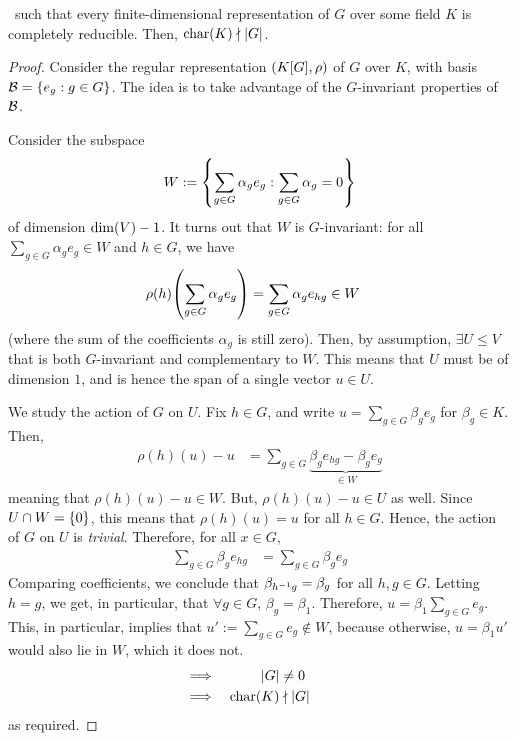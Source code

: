 \begin{theorem}
    \ such that every finite-dimensional representation of $G$ over some field $K$ is completely reducible. Then, $\operatorname{char}\!\left( K \right) \nmid \left\lvert G \right\rvert$.
\end{theorem}
\begin{proof}
    Consider the regular representation $\left( K[G], \rho \right)$ of $G$ over $K$, with basis $\mathcal{B} = \left\{ e_g : g \in G \right\}$. The idea is to take advantage of the $G$-invariant properties of $\mathcal{B}$.

    Consider the subspace
    \begin{align*}
        W := \left\{ \sum_{g \in G} \alpha_g e_g : \sum_{g \in G} \alpha_g = 0 \right\}
    \end{align*}
    of dimension $\dim\!\left( V \right) - 1$. It turns out that $W$ is $G$-invariant: for all $\sum_{g \in G} \alpha_g e_g \in W$ and $h \in G$, we have
    \begin{align*}
        \rho(h)\!\left( \sum_{g \in G} \alpha_g e_g \right) &= \sum_{g \in G} \alpha_g e_{hg} \in W
    \end{align*}
    (where the sum of the coefficients $\alpha_g$ is still zero). Then, by assumption, $\exists U \leq V$ that is both $G$-invariant and complementary to $W$. This means that $U$ must be of dimension $1$, and is hence the span of a single vector $u \in U$.

    We study the action of $G$ on $U$. Fix $h \in G$, and write $u = \sum_{g \in G} \beta_g e_g$ for $\beta_g \in K$. Then,
    \begin{align*}
        \rho(h)(u) - u
        &= \sum_{g \in G} \underbrace{\beta_g e_{hg} - \beta_g e_g}_{\in W}
    \end{align*}
    meaning that $\rho(h)(u) - u \in W$. But, $\rho(h)(u) - u \in U$ as well. Since $U \cap W = \left\{ 0 \right\}$, this means that $\rho(h)(u) = u$ for all $h \in G$. Hence, the action of $G$ on $U$ is \textit{trivial}. Therefore, for all $x \in G$,
    \begin{align*}
        \sum_{g \in G} \beta_g e_{hg} &= \sum_{g \in G} \beta_g e_g
    \end{align*}
    Comparing coefficients, we conclude that $\beta_{h^{-1} g} = \beta_g$ for all $h,g \in G$. Letting $h = g$, we get, in particular, that $\forall g \in G$, $\beta_g = \beta_1$. Therefore, $u = \beta_1 \sum_{g \in G} e_g$. This, in particular, implies that $u' := \sum_{g \in G} e_g \notin W$, because otherwise, $u = \beta_1 u'$ would also lie in $W$, which it does not.
    \begin{align*}
        &\implies& \left\lvert G \right\rvert &\neq 0 &&& \\
        &\implies& \operatorname{char}\!\left( K \right) &\nmid \left\lvert G \right\rvert &&&
    \end{align*}
    as required.
\end{proof}

